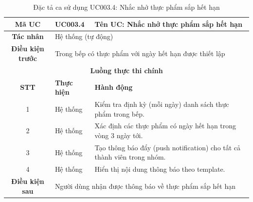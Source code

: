 \begin{table}[H]
    \centering
    \label{tab:uc003-4}
    \begin{tabularx}{\textwidth}{|c|p{3.5cm}|X|}
        \hline
        \rowcolor{headergreen} 
        \textbf{Mã UC} & \textbf{UC003.4} & \textbf{Tên UC: Nhắc nhở thực phẩm sắp hết hạn} \\ \hline
        \textbf{Tác nhân} & \multicolumn{2}{l|}{Hệ thống (tự động)} \\ \hline
        \textbf{Điều kiện trước} & \multicolumn{2}{X|}{Trong bếp có thực phẩm với ngày hết hạn được thiết lập} \\ \hline
        
        \multicolumn{3}{|c|}{\cellcolor{headerorange}\textbf{Luồng thực thi chính}} \\ \hline
        \rowcolor{graybg} \textbf{STT} & \textbf{Thực hiện} & \textbf{Hành động} \\ \hline
        1 & Hệ thống & Kiểm tra định kỳ (mỗi ngày) danh sách thực phẩm trong bếp. \\ \hline
        2 & Hệ thống & Xác định các thực phẩm có ngày hết hạn trong vòng 3 ngày tới. \\ \hline
        3 & Hệ thống & Tạo thông báo đẩy (push notification) cho tất cả thành viên trong nhóm. \\ \hline
        4 & Hệ thống & Hiển thị nội dung thông báo theo template. \\ \hline
        
        \textbf{Điều kiện sau} & \multicolumn{2}{X|}{Người dùng nhận được thông báo về thực phẩm sắp hết hạn} \\ \hline
    \end{tabularx}
    \caption{Đặc tả ca sử dụng UC003.4: Nhắc nhở thực phẩm sắp hết hạn}
\end{table}

